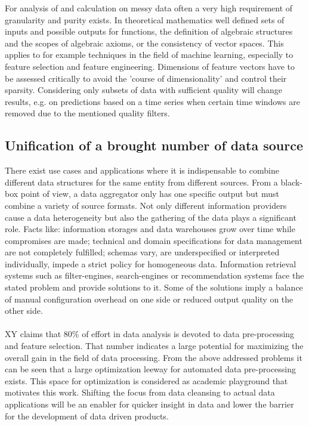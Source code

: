 For analysis of and calculation on messy data often a very high requirement of granularity and purity exists. In theoretical mathematics well defined sets of inputs and possible outputs for functions, the definition of algebraic structures and the scopes of algebraic axioms, or the consistency of vector spaces. This applies to for example techniques in the field of machine learning, especially to feature selection and feature engineering. Dimensions of feature vectors have to be assessed critically to avoid the 'course of dimensionality' and control their sparsity. Considering only subsets of data with sufficient quality will change results, e.g. on predictions based on a time series when certain time windows are removed due to the mentioned quality filters.

\subsection{Unification of a brought number of data source} 

There exist use cases and applications where it is indispensable to combine different data structures for the same entity from different sources. From a black-box point of view, a data aggregator only has one specific output but must combine a variety of source formats. Not only different information providers cause a data  heterogeneity but also the gathering of the data plays a significant role. Facts like: information storages and data warehouses grow over time while compromises are made; technical and domain specifications for data management are not completely fulfilled; schemas vary, are underspecified or interpreted individually, impede a strict policy for homogeneous data. Information retrieval systems such as filter-engines, search-engines or recommendation systems face the stated problem and provide solutions to it. Some of the solutions imply a balance of manual configuration overhead on one side or reduced output quality on the other side. 
\\\\
XY claims that 80\% of effort in data analysis is devoted to data pre-processing and feature selection. That number indicates a large potential for maximizing the overall gain in the field of data processing. From the above addressed problems it can be seen that a large optimization leeway for automated data pre-processing exists. This space for optimization is considered as academic playground that motivates this work. Shifting the focus from data cleansing to actual data applications will be an enabler for quicker insight in data and lower the barrier for the development of data driven products.

